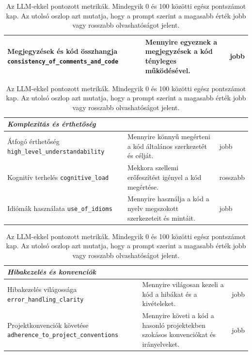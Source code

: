 \documentclass[
]{elteikthesis}[2024/04/26]
\begin{document}
\begin{table}[htb]
\begin{tabular}{ | p{5.9cm} | p{5.5cm} | p{1.9cm} | }
		Megjegyzések és kód összhangja \newline
		\texttt{consistency\_of\_comments\_and\_code} &
		Mennyire egyeznek a megjegyzések a kód tényleges működésével. & jobb \\
		\hline
	\end{tabular}\par\medskip
	\begin{tabular}{ | p{5.9cm} | p{5.5cm} | p{1.9cm} | }
		\hline
		\multicolumn{3}{|l|}{\textit{Komplexitás és érthetőség}} \\
		\hline
		Átfogó érthetőség \newline \texttt{high\_level\_understandability} &
		Mennyire könnyű megérteni a kód általános szerkezetét és célját. & jobb \\
		\hline
		Kognitív terhelés \newline \texttt{cognitive\_load} &
		Mekkora szellemi erőfeszítést igényel a kód megértése. & rosszabb \\
		\hline
		Idiómák használata \newline \texttt{use\_of\_idioms} &
		Mennyire használja a kód a nyelv megszokott szerkezeteit és mintáit. &
		jobb \\
		\hline
	\end{tabular}\par\medskip
	\begin{tabular}{ | p{5.9cm} | p{5.5cm} | p{1.9cm} | }
		\hline
		\multicolumn{3}{|l|}{\textit{Hibakezelés és konvenciók}} \\
		\hline
		Hibakezelés világossága \newline \texttt{error\_handling\_clarity} &
		Mennyire világosan kezeli a kód a hibákat és a kivételeket. & jobb \\
		\hline
		Projektkonvenciók követése \newline
		\texttt{adherence\_to\_project\_conventions} &
		Mennyire követi a kód a hasonló projektekben szokásos konvenciókat és
		irányelveket. & jobb \\
		\hline
	\end{tabular}
	\caption[Az LLM-ekkel pontozott metrikák]{Az LLM-ekkel pontozott metrikák.
	Mindegyik 0 és 100 közötti egész pontszámot kap. Az utolsó oszlop azt mutatja,
	hogy a prompt szerint a magasabb érték jobb vagy rosszabb olvashatóságot
	jelent.}
	\label{tab:method:llmmetrics}
\end{table}

\end{document}
